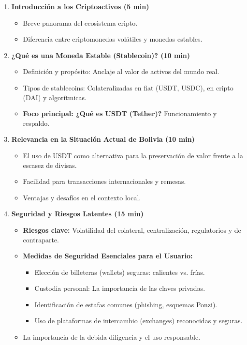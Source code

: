 \documentclass[12pt,a4paper]{article}
\begin{document}
\begin{enumerate}
    \item \textbf{Introducción a los Criptoactivos (5 min)}
    \begin{itemize}
        \item Breve panorama del ecosistema cripto.
        \item Diferencia entre criptomonedas volátiles y monedas estables.
    \end{itemize}
    
    \item \textbf{¿Qué es una Moneda Estable (Stablecoin)? (10 min)}
    \begin{itemize}
        \item Definición y propósito: Anclaje al valor de activos del mundo real.
        \item Tipos de stablecoins: Colateralizadas en fiat (USDT, USDC), en cripto (DAI) y algorítmicas.
        \item \textbf{Foco principal: ¿Qué es USDT (Tether)?} Funcionamiento y respaldo.
    \end{itemize}
    
    \item \textbf{Relevancia en la Situación Actual de Bolivia (10 min)}
    \begin{itemize}
        \item El uso de USDT como alternativa para la preservación de valor frente a la escasez de divisas.
        \item Facilidad para transacciones internacionales y remesas.
        \item Ventajas y desafíos en el contexto local.
    \end{itemize}
    
    \item \textbf{Seguridad y Riesgos Latentes (15 min)}
    \begin{itemize}
        \item \textbf{Riesgos clave:} Volatilidad del colateral, centralización, regulatorios y de contraparte.
        \item \textbf{Medidas de Seguridad Esenciales para el Usuario:}
        \begin{itemize}
            \item Elección de billeteras (wallets) seguras: calientes vs. frías.
            \item Custodia personal: La importancia de las claves privadas.
            \item Identificación de estafas comunes (phishing, esquemas Ponzi).
            \item Uso de plataformas de intercambio (exchanges) reconocidas y seguras.
        \end{itemize}
        \item La importancia de la debida diligencia y el uso responsable.
    \end{itemize}
\end{enumerate}
\end{document}
